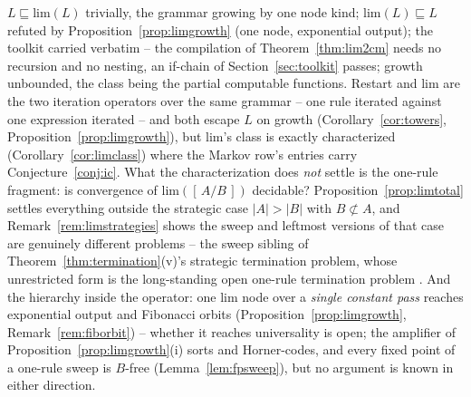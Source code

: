 \noindent $L \sqsubseteq \mathrm{lim}(L)$ trivially, the grammar growing
by one node kind; $\mathrm{lim}(L) \sqsubseteq L$ refuted by
Proposition~\ref{prop:limgrowth} (one node, exponential output); the
toolkit carried verbatim -- the compilation of
Theorem~\ref{thm:lim2cm} needs no recursion and no nesting, an if-chain
of Section~\ref{sec:toolkit} passes; growth unbounded, the class being
the partial computable functions. Restart and $\mathrm{lim}$ are the
two iteration operators over the same grammar -- one rule iterated
against one expression iterated -- and both escape $L$ on growth
(Corollary~\ref{cor:towers}, Proposition~\ref{prop:limgrowth}), but
$\mathrm{lim}$'s class is exactly characterized
(Corollary~\ref{cor:limclass}) where the Markov row's entries carry
Conjecture~\ref{conj:ic}. What the characterization does \emph{not}
settle is the one-rule fragment: is convergence of
$\mathrm{lim}([\,A/B\,])$ decidable? Proposition~\ref{prop:limtotal}
settles everything outside the strategic case $|A| > |B|$ with
$B \not\subset A$, and Remark~\ref{rem:limstrategies} shows the sweep
and leftmost versions of that case are genuinely different problems --
the sweep sibling of Theorem~\ref{thm:termination}(v)'s strategic
termination problem, whose unrestricted form is the long-standing open
one-rule termination problem \cite{geser01}. And the hierarchy inside the
operator: one $\mathrm{lim}$ node over a \emph{single constant pass}
reaches exponential output and Fibonacci orbits
(Proposition~\ref{prop:limgrowth}, Remark~\ref{rem:fiborbit}) -- whether
it reaches universality is open; the amplifier of
Proposition~\ref{prop:limgrowth}(i) sorts and Horner-codes, and every
fixed point of a one-rule sweep is $B$-free
(Lemma~\ref{lem:fpsweep}), but no argument is known in either
direction.
